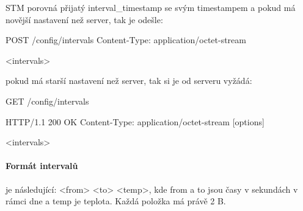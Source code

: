 STM porovná přijatý interval_timestamp se svým timestampem a pokud má novější nastavení než server,
tak je odešle:
\begin{packetstm}
POST /config/intervals
Content-Type: application/octet-stream

<intervals>
\end{packetstm}

pokud má starší nastavení než server, tak si je od serveru vyžádá:
\begin{packetstm}
GET /config/intervals
\end{packetstm}

\begin{packetserver}
HTTP/1.1 200 OK
Content-Type: application/octet-stream
[options]

<intervals>
\end{packetserver}

\paragraph{Formát intervalů}
je následující:
<from> <to> <temp>, kde from a to jsou časy v sekundách v rámci dne a temp je teplota.
Každá položka má právě 2 B.
